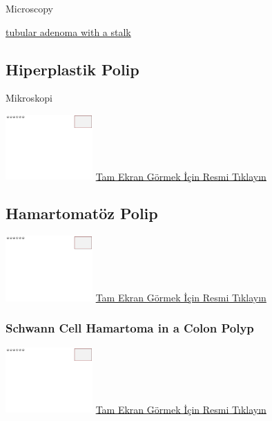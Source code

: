 \documentclass[
  letterpaper,
  paper=6in:9in,
  pagesize=pdftex,
  headinclude=on,
  footinclude=on,
  12pt]{scrbook}
\begin{document}
Microscopy

\href{https://images.patolojiatlasi.com/tubularadenoma/tubular-adenoma-with-stalk.jpeg}{tubular
adenoma with a stalk}

\hypertarget{sec-kolon-hiperplastik-polip}{%
\subsection{Hiperplastik Polip}\label{sec-kolon-hiperplastik-polip}}

Mikroskopi

\href{https://images.patolojiatlasi.com/template/HE.html}{\includegraphics[width=0.25\textwidth,height=\textheight]{./screenshots/template_screenshot.png}}
\href{https://images.patolojiatlasi.com/hyperplasticpolyp/case1.html}{Tam
Ekran Görmek İçin Resmi Tıklayın}

\hypertarget{sec-kolon-hamartomatoz-polip}{%
\subsection{Hamartomatöz Polip}\label{sec-kolon-hamartomatoz-polip}}

\href{https://images.patolojiatlasi.com/template/HE.html}{\includegraphics[width=0.25\textwidth,height=\textheight]{./screenshots/template_screenshot.png}}
\href{https://images.patolojiatlasi.com/hamartomatouspolyp/HE.html}{Tam
Ekran Görmek İçin Resmi Tıklayın}

\hypertarget{sec-colon-schwann-cell-hamartoma}{%
\subsubsection{Schwann Cell Hamartoma in a Colon
Polyp}\label{sec-colon-schwann-cell-hamartoma}}

\href{https://images.patolojiatlasi.com/template/HE.html}{\includegraphics[width=0.25\textwidth,height=\textheight]{./screenshots/template_screenshot.png}}
\href{https://images.patolojiatlasi.com/schwanncellhamartoma/HE.html}{Tam
Ekran Görmek İçin Resmi Tıklayın}
\end{document}
